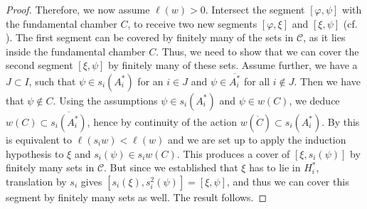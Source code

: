 \begin{proof}
    Therefore, we now assume \(\ell(w) > 0\).
    Intersect the segment \([\varphi, \psi]\) with the fundamental chamber \(C\), to receive two new segments \([\varphi, \xi]\) and \([\xi, \psi]\) (cf. ).
    The first segment can be covered by finitely many of the sets in \(\mathcal{C}\), as it lies inside the fundamental chamber \(C\).
    Thus, we need to show that we can cover the second segment \([\xi, \psi]\) by finitely many of these sets.
    Assume further, we have a \(J \subset I\), such that \(\psi\in s_i(A_i^*)\) for an \(i\in J\) and \(\psi\in\overline{A_i^*}\) for all \(i\notin J\).
    Then we have that \(\psi\notin C\).
    Using the assumptions \(\psi\in s_i(A_i^*)\) and \(\psi\in w(C)\), we deduce \(w(C)\subset \overline{s_i(A_i^*)}\), hence by continuity of the action \(w(\mathring{C})\subset s_i(A_i^*)\).
    By  this is equivalent to \(\ell(s_iw) < \ell(w)\) and we are set up to apply the induction hypothesis to \(\xi\) and \(s_i(\psi)\in s_iw(C)\).
    This produces a cover of \([\xi,s_i(\psi)]\) by finitely many sets in \(\mathcal{C}\).
    But since we established that \(\xi\) has to lie in \(H_i^*\), translation by \(s_i\) gives \([s_i(\xi), s_i^2(\psi)] = [\xi, \psi]\), and thus we can cover this segment by finitely many sets as well.
    The result follows.
\end{proof}


